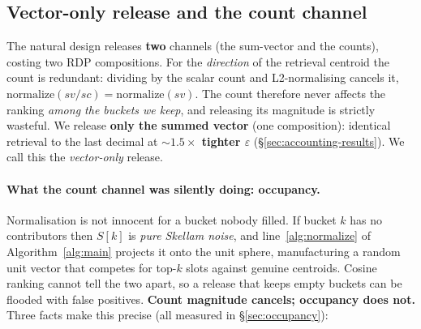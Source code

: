 \documentclass[pdflatex,sn-mathphys-num,12pt]{sn-jnl}
\theoremstyle{thmstyleone}%
\theoremstyle{thmstyletwo}%
\theoremstyle{thmstylethree}%
\newcommand{\eps}{\varepsilon}
\newcommand{\secref}[1]{\S\ref{#1}}
\begin{document}
\subsection{Vector-only release and the count channel}\label{sec:vector-only}

The natural design releases \textbf{two} channels (the sum-vector and the counts),
costing two RDP compositions. For the \emph{direction} of the retrieval centroid the
count is redundant: dividing by the scalar count and L2-normalising cancels it,
$\mathrm{normalize}(sv/sc) = \mathrm{normalize}(sv)$. The count therefore never
affects the ranking \emph{among the buckets we keep}, and releasing its magnitude is
strictly wasteful. We release \textbf{only the summed vector} (one composition):
identical retrieval to the last decimal at \textbf{${\sim}1.5\times$ tighter $\eps$}
(\secref{sec:accounting-results}). We call this the \emph{vector-only} release.

\paragraph{What the count channel was silently doing: occupancy.} Normalisation is
not innocent for a bucket nobody filled. If bucket $k$ has no contributors then
$S[k]$ is \emph{pure Skellam noise}, and line~\ref{alg:normalize} of
Algorithm~\ref{alg:main} projects it onto the unit sphere, manufacturing a random
unit vector that competes for top-$k$ slots against genuine centroids. Cosine
ranking cannot tell the two apart, so a release that keeps empty buckets can be
flooded with false positives. \textbf{Count magnitude cancels; occupancy does not.}
Three facts make this precise (all measured in \secref{sec:occupancy}):
\end{document}
